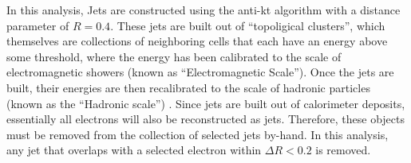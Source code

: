 
In this analysis, Jets are constructed using the anti-kt algorithm with a distance parameter of $R=0.4$.
These jets are built out of ``topoligical clusters'', which themselves are collections of neighboring cells that each have an energy above some threshold, where the energy has been calibrated to the scale of electromagnetic showers (known as ``Electromagnetic Scale'').
Once the jets are built, their energies are then recalibrated to the scale of hadronic particles (known as the ``Hadronic scale'') \cite{JES_SCALE_2010}.
Since jets are built out of calorimeter deposits, essentially all electrons will also be reconstructed as jets.
Therefore, these objects must be removed from the collection of selected jets by-hand.
In this analysis, any jet that overlaps with a selected electron within $\Delta R < 0.2$ is removed.


